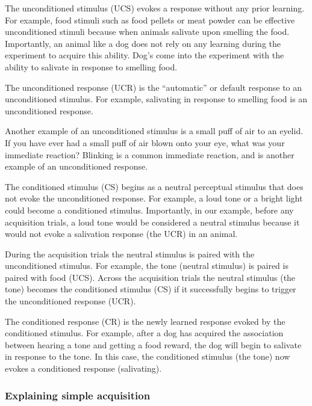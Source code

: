 \documentclass[
  oneside,
  12pt]{crumpbook}
\begin{document}
The unconditioned stimulus (UCS) evokes a response without any prior learning. For example, food stimuli such as food pellets or meat powder can be effective unconditioned stimuli because when animals salivate upon smelling the food. Importantly, an animal like a dog does not rely on any learning during the experiment to acquire this ability. Dog's come into the experiment with the ability to salivate in response to smelling food.

The unconditioned response (UCR) is the ``automatic'' or default response to an unconditioned stimulus. For example, salivating in response to smelling food is an unconditioned response.

Another example of an unconditioned stimulus is a small puff of air to an eyelid. If you have ever had a small puff of air blown onto your eye, what was your immediate reaction? Blinking is a common immediate reaction, and is another example of an unconditioned response.

The conditioned stimulus (CS) begins as a neutral perceptual stimulus that does not evoke the unconditioned response. For example, a loud tone or a bright light could become a conditioned stimulus. Importantly, in our example, before any acquisition trials, a loud tone would be considered a neutral stimulus because it would not evoke a salivation response (the UCR) in an animal.

During the acquisition trials the neutral stimulus is paired with the unconditioned stimulus. For example, the tone (neutral stimulus) is paired is paired with food (UCS). Across the acquisition trials the neutral stimulus (the tone) becomes the conditioned stimulus (CS) if it successfully begins to trigger the unconditioned response (UCR).

The conditioned response (CR) is the newly learned response evoked by the conditioned stimulus. For example, after a dog has acquired the association between hearing a tone and getting a food reward, the dog will begin to salivate in response to the tone. In this case, the conditioned stimulus (the tone) now evokes a conditioned response (salivating).

\hypertarget{explaining-simple-acquisition}{%
\subsubsection{Explaining simple acquisition}\label{explaining-simple-acquisition}}
\end{document}
